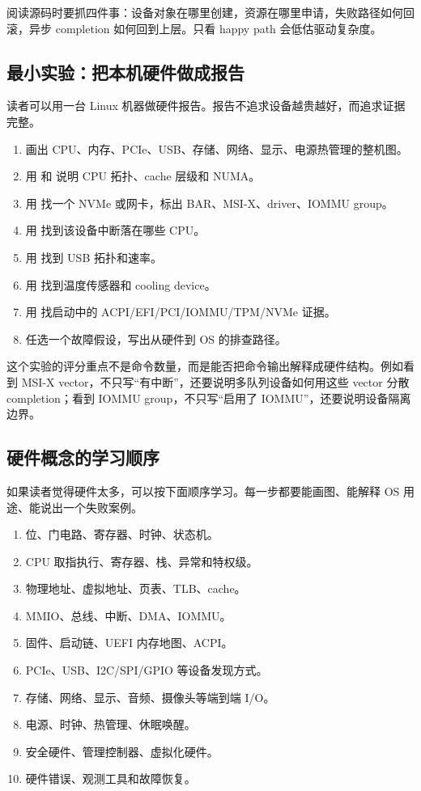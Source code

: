 阅读源码时要抓四件事：设备对象在哪里创建，资源在哪里申请，失败路径如何回滚，异步 completion 如何回到上层。只看 happy path 会低估驱动复杂度。

\subsection{最小实验：把本机硬件做成报告}

读者可以用一台 Linux 机器做硬件报告。报告不追求设备越贵越好，而追求证据完整。

\begin{enumerate}
\tightlist
\item 画出 CPU、内存、PCIe、USB、存储、网络、显示、电源热管理的整机图。
\item 用  和  说明 CPU 拓扑、cache 层级和 NUMA。
\item 用  找一个 NVMe 或网卡，标出 BAR、MSI-X、driver、IOMMU group。
\item 用  找到该设备中断落在哪些 CPU。
\item 用  找到 USB 拓扑和速率。
\item 用  找到温度传感器和 cooling device。
\item 用  找启动中的 ACPI/EFI/PCI/IOMMU/TPM/NVMe 证据。
\item 任选一个故障假设，写出从硬件到 OS 的排查路径。
\end{enumerate}

这个实验的评分重点不是命令数量，而是能否把命令输出解释成硬件结构。例如看到 MSI-X vector，不只写“有中断”，还要说明多队列设备如何用这些 vector 分散 completion；看到 IOMMU group，不只写“启用了 IOMMU”，还要说明设备隔离边界。

\subsection{硬件概念的学习顺序}

如果读者觉得硬件太多，可以按下面顺序学习。每一步都要能画图、能解释 OS 用途、能说出一个失败案例。

\begin{enumerate}
\tightlist
\item 位、门电路、寄存器、时钟、状态机。
\item CPU 取指执行、寄存器、栈、异常和特权级。
\item 物理地址、虚拟地址、页表、TLB、cache。
\item MMIO、总线、中断、DMA、IOMMU。
\item 固件、启动链、UEFI 内存地图、ACPI。
\item PCIe、USB、I2C/SPI/GPIO 等设备发现方式。
\item 存储、网络、显示、音频、摄像头等端到端 I/O。
\item 电源、时钟、热管理、休眠唤醒。
\item 安全硬件、管理控制器、虚拟化硬件。
\item 硬件错误、观测工具和故障恢复。
\end{enumerate}

